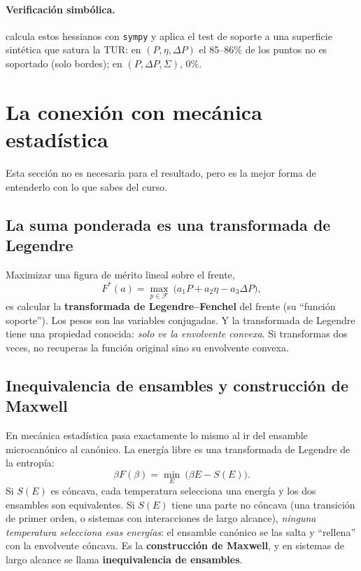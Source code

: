 \paragraph{Verificación simbólica.}  calcula estos hessianos con
\texttt{sympy} y aplica el test de soporte a una superficie sintética que satura la TUR: en
$(P,\eta,\Delta P)$ el 85--86\% de los puntos no es soportado (solo bordes); en $(P,\Delta P,\Sigma)$,
0\%.

\section{La conexión con mecánica estadística}
\label{sec:legendre}

Esta sección no es necesaria para el resultado, pero es la mejor forma de entenderlo con lo que
sabes del curso.

\subsection{La suma ponderada es una transformada de Legendre}

Maximizar una figura de mérito lineal sobre el frente,
\begin{equation}
F^*(a) = \max_{p\in\mathcal{F}}\ \bigl(a_1 P + a_2\eta - a_3\Delta P\bigr),
\end{equation}
es calcular la \textbf{transformada de Legendre--Fenchel} del frente (su ``función soporte''). Los
pesos son las variables conjugadas. Y la transformada de Legendre tiene una propiedad conocida:
\emph{solo ve la envolvente convexa}. Si transformas dos veces, no recuperas la función original
sino su envolvente convexa.

\subsection{Inequivalencia de ensambles y construcción de Maxwell}

En mecánica estadística pasa exactamente lo mismo al ir del ensamble microcanónico al canónico. La
energía libre es una transformada de Legendre de la entropía:
\begin{equation}
\beta F(\beta) = \min_E\ \bigl(\beta E - S(E)\bigr).
\end{equation}
Si $S(E)$ es cóncava, cada temperatura selecciona una energía y los dos ensambles son
equivalentes. Si $S(E)$ tiene una parte no cóncava (una transición de primer orden, o sistemas con
interacciones de largo alcance), \emph{ninguna temperatura selecciona esas energías}: el ensamble
canónico se las salta y ``rellena'' con la envolvente cóncava. Es la \textbf{construcción de
Maxwell}, y en sistemas de largo alcance se llama \textbf{inequivalencia de ensambles}.

